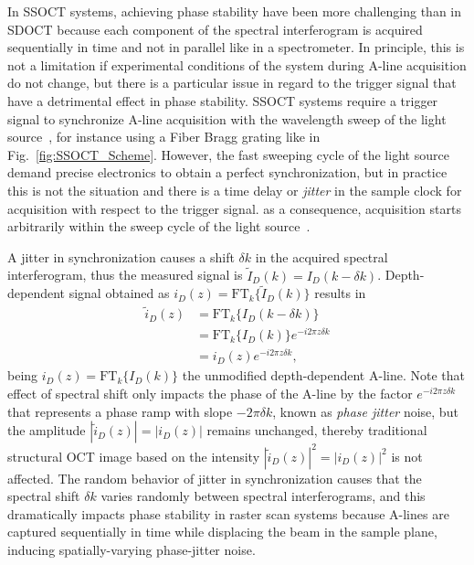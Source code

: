 In SSOCT systems, achieving phase stability have been more challenging than in SDOCT because each component of the spectral interferogram is acquired sequentially in time and not in parallel like in a spectrometer. In principle, this is not a limitation if experimental conditions of the system during A-line acquisition do not change, but there is a particular issue in regard to the trigger signal that have a detrimental effect in phase stability. SSOCT systems require a trigger signal to synchronize A-line acquisition with the wavelength sweep of the light source~\cite{Vakoc2005_Phaseresolved}, for instance using a Fiber Bragg grating like in Fig.~\ref{fig:SSOCT_Scheme}. However, the fast sweeping cycle of the light source demand precise electronics to obtain a perfect synchronization, but in practice this is not the situation and there is a time delay or \textit{jitter} in the sample clock for acquisition with respect to the trigger signal. as a consequence, acquisition starts arbitrarily within the sweep cycle of the light source~\cite{Vakoc2005_Phaseresolved}.

A jitter in synchronization causes a shift $\delta k$ in the acquired spectral interferogram, thus the measured signal is $\tilde{I}_D(k) = I_D(k-\delta k)$. Depth-dependent signal obtained as $i_D(z)= \text{FT}_k\{\tilde{I}_D(k)\}$ results in~\cite{Hong2012_Highpenetration}
\begin{align} \label{eq:phaseJitter}
    \tilde{i}_D(z) &= \text{FT}_k\{I_D(k-\delta k)\} \nonumber \\
    &=  \text{FT}_k\{I_D(k)\} e^{-i2\pi z\delta k} \nonumber \\
    &=  i_D(z) e^{-i2\pi z\delta k},
\end{align}
being $i_D(z)=\text{FT}_k\{I_D(k)\}$ the unmodified depth-dependent A-line. Note that effect of spectral shift only impacts the phase of the A-line by the factor $e^{-i2\pi z\delta k}$ that represents a phase ramp with slope $-2\pi\delta k$, known as \textit{phase jitter} noise, but the amplitude $|\tilde{i}_D(z)|=|i_D(z)|$ remains unchanged, thereby traditional structural OCT image based on the intensity $|\tilde{i}_D(z)|^2=|i_D(z)|^2$ is not affected. The random behavior of jitter in synchronization causes that the spectral shift $\delta k$ varies randomly between spectral interferograms, and this dramatically impacts phase stability in raster scan systems because A-lines are captured sequentially in time while displacing the beam in the sample plane, inducing spatially-varying phase-jitter noise.

